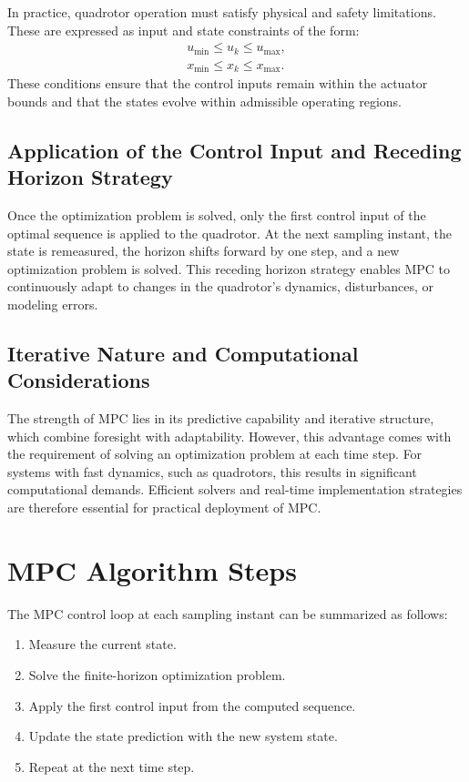 \documentclass[a4paper,11pt,oneside]{book}
\begin{document}
In practice, quadrotor operation must satisfy physical and safety limitations. These are expressed as input and state constraints of the form:  
\begin{align}
u_{\min} \leq u_k \leq u_{\max}, \\
x_{\min} \leq x_k \leq x_{\max}.
\end{align}
These conditions ensure that the control inputs remain within the actuator bounds and that the states evolve within admissible operating regions.  

\subsection{Application of the Control Input and Receding Horizon Strategy}

Once the optimization problem is solved, only the first control input of the optimal sequence is applied to the quadrotor. At the next sampling instant, the state is remeasured, the horizon shifts forward by one step, and a new optimization problem is solved. This receding horizon strategy enables MPC to continuously adapt to changes in the quadrotor’s dynamics, disturbances, or modeling errors.  

\subsection{Iterative Nature and Computational Considerations}

The strength of MPC lies in its predictive capability and iterative structure, which combine foresight with adaptability. However, this advantage comes with the requirement of solving an optimization problem at each time step. For systems with fast dynamics, such as quadrotors, this results in significant computational demands. Efficient solvers and real-time implementation strategies are therefore essential for practical deployment of MPC.  


\section{MPC Algorithm Steps}
The MPC control loop at each sampling instant can be summarized as follows:
\begin{enumerate}
    \item Measure the current state.  
    \item Solve the finite-horizon optimization problem.  
    \item Apply the first control input from the computed sequence.  
    \item Update the state prediction with the new system state.  
    \item Repeat at the next time step.  
\end{enumerate}
\end{document}
